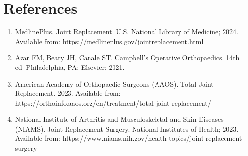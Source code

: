\section*{References}
\begin{enumerate}
  \item MedlinePlus. Joint Replacement. U.S. National Library of Medicine; 2024. Available from: https://medlineplus.gov/jointreplacement.html
  \item Azar FM, Beaty JH, Canale ST. Campbell's Operative Orthopaedics. 14th ed. Philadelphia, PA: Elsevier; 2021.
  \item American Academy of Orthopaedic Surgeons (AAOS). Total Joint Replacement. 2023. Available from: https://orthoinfo.aaos.org/en/treatment/total-joint-replacement/
  \item National Institute of Arthritis and Musculoskeletal and Skin Diseases (NIAMS). Joint Replacement Surgery. National Institutes of Health; 2023. Available from: https://www.niams.nih.gov/health-topics/joint-replacement-surgery
\end{enumerate}

\clearpage
